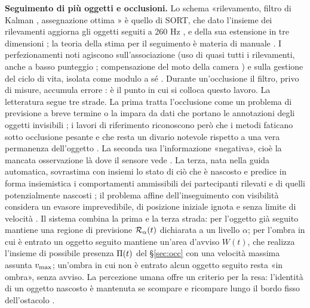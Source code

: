 \textbf{Seguimento di più oggetti e occlusioni.} Lo schema «rilevamento, filtro di Kalman \cite{kalman1960}, assegnazione ottima \cite{kuhn1955}» è quello di SORT, che dato l'insieme dei rilevamenti aggiorna gli oggetti seguiti a 260 Hz \cite{bewley2016}, e della sua estensione in tre dimensioni \cite{weng2020}; la teoria della stima per il seguimento è materia di manuale \cite{barshalom2001}. I perfezionamenti noti agiscono sull'associazione (uso di quasi tutti i rilevamenti, anche a basso punteggio \cite{zhang2022}; compensazione del moto della camera \cite{aharon2022}) e sulla gestione del ciclo di vita, isolata come modulo a sé \cite{pang2021}. Durante un'occlusione il filtro, privo di misure, accumula errore \cite{cao2023}: è il punto in cui si colloca questo lavoro. La letteratura segue tre strade. La prima tratta l'occlusione come un problema di previsione a breve termine \cite{khurana2021} o la impara da dati che portano le annotazioni degli oggetti invisibili \cite{tokmakov2021}; i lavori di riferimento riconoscono però che i metodi faticano sotto occlusione pesante \cite{hsieh2023} e che resta un divario notevole rispetto a una vera permanenza dell'oggetto \cite{vanhoorick2023}. La seconda usa l'informazione «negativa», cioè la mancata osservazione là dove il sensore vede \cite{koch2007,wyffels2015,krejci2026}. La terza, nata nella guida automatica, sovrastima con insiemi lo stato di ciò che è nascosto \cite{orzechowski2018} e predice in forma insiemistica i comportamenti ammissibili dei partecipanti rilevati e di quelli potenzialmente nascosti \cite{koschi2021}; il problema affine dell'inseguimento con visibilità considera un evasore imprevedibile, di posizione iniziale ignota e senza limite di velocità \cite{guibas1997}. Il sistema combina la prima e la terza strada: per l'oggetto già seguito mantiene una regione di previsione $\mathcal{R}_\alpha(t)$ dichiarata a un livello $\alpha$; per l'ombra in cui è entrato un oggetto seguito mantiene un'area d'avviso $W(t)$, che realizza l'insieme di possibile presenza $\Pi(t)$ del \S\ref{sec:occ} con una velocità massima assunta $v_{\max}$; un'ombra in cui non è entrato alcun oggetto seguito resta «in ombra», senza avviso. La percezione umana offre un criterio per la resa: l'identità di un oggetto nascosto è mantenuta se scompare e ricompare lungo il bordo fisso dell'ostacolo \cite{scholl1999}.

